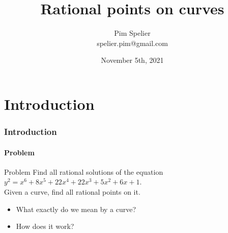 \documentclass[15pt]{beamer}
\title{Rational points on curves}
\author[Pim Spelier]{
  Pim Spelier\\\medskip
  {\small {spelier.pim@gmail.com}
  }}
\institute[Leiden University]{
  Mathematical Institute, Leiden University \\
  }
\date{November 5th, 2021}
\begin{document}
\begin{frame}
  \titlepage
\end{frame}


\section{Introduction}
\begin{frame}
    \frametitle{Introduction}
    \framesubtitle{Problem}
    \begin{block}{Problem}
    	Find all rational solutions of the equation $y^2 = x^6 + 8x^5 + 22x^4 + 22x^3 + 5x^2 + 6x + 1$.\\\pause
        Given a curve, find all rational points on it.
    \end{block}\pause
    \begin{itemize}[<+->]
	\item What exactly do we mean by a curve?
	\item How does it work?
	\end{itemize}
    
\end{frame}
\end{document}
